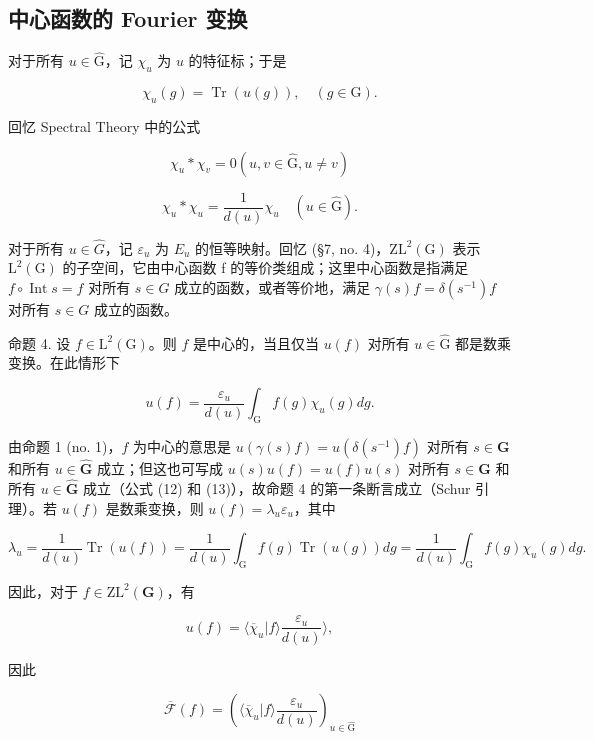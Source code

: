 \subsection{中心函数的 Fourier 变换}

对于所有 \(u \in \hat{\mathrm{G}}\)，记 \(\chi_u\) 为 \(u\) 的特征标；于是

\[
\chi_ {u} (g) = \operatorname{Tr} (u (g)), \quad (g \in \mathrm{G}).\tag{16}
\]

回忆 Spectral Theory 中的公式

\[
\chi_ {u} * \chi_ {v} = 0 (u, v \in \hat {\mathrm{G}}, u \neq v)\tag{17}
\]

\[
\chi_ {u} * \chi_ {u} = \frac {1}{d (u)} \chi_ {u} \quad (u \in \hat {\mathrm{G}}).\tag{18}
\]

对于所有 \(u \in \hat{G}\)，记 \(\varepsilon_{u}\) 为 \(E_{u}\) 的恒等映射。回忆 (§7, no. 4)，\(\mathrm{ZL}^{2}(\mathrm{G})\) 表示 \(\mathrm{L}^{2}(\mathrm{G})\) 的子空间，它由中心函数 f 的等价类组成；这里中心函数是指满足 \(f \circ \operatorname{Int}s = f\) 对所有 \(s \in G\) 成立的函数，或者等价地，满足 \(\gamma(s)f = \delta(s^{-1})f\) 对所有 \(s \in G\) 成立的函数。

命题 4. 设 \(f \in \mathrm{L}^2(\mathrm{G})\)。则 \(f\) 是中心的，当且仅当 \(u(f)\) 对所有 \(u \in \hat{\mathrm{G}}\) 都是数乘变换。在此情形下

\[
u (f) = \frac {\varepsilon_ {u}}{d (u)} \int_ {\mathrm{G}} f (g) \chi_ {u} (g) d g.\tag{19}
\]

由命题 1 (no. 1)，\(f\) 为中心的意思是 \(u(\gamma(s)f) = u(\delta(s^{-1})f)\) 对所有 \(s \in \mathbf{G}\) 和所有 \(u \in \hat{\mathbf{G}}\) 成立；但这也可写成 \(u(s)u(f) = u(f)u(s)\) 对所有 \(s \in \mathbf{G}\) 和所有 \(u \in \hat{\mathbf{G}}\) 成立（公式 (12) 和 (13)），故命题 4 的第一条断言成立（Schur 引理）。若 \(u(f)\) 是数乘变换，则 \(u(f) = \lambda_u\varepsilon_u\)，其中

\[
\lambda_ {u} = \frac {1}{d (u)} \operatorname{Tr} (u (f)) = \frac {1}{d (u)} \int_ {\mathrm{G}} f (g) \operatorname{Tr} (u (g)) d g = \frac {1}{d (u)} \int_ {\mathrm{G}} f (g) \chi_ {u} (g) d g.
\]

因此，对于 \(f \in \mathrm{ZL}^2(\mathbf{G})\)，有

\[
u (f) = \langle \overline {{\chi}} _ {u} | f \rangle \frac {\varepsilon_ {u}}{d (u)} \rangle ,\tag{20}
\]

因此

\[
\overline {{{{\mathcal {F}}}}} (f) = \left(\langle \overline {{{{\chi}}}} _ {u} | f \rangle \frac {\varepsilon_ {u}}{d (u)}\right) _ {u \in \hat {\mathrm{G}}}\tag{21}
\]

